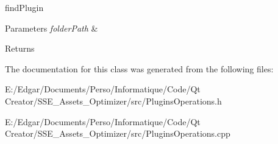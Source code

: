 find\+Plugin 


\begin{DoxyParams}{Parameters}
{\em folder\+Path} & \\
\hline
\end{DoxyParams}
\begin{DoxyReturn}{Returns}

\end{DoxyReturn}


The documentation for this class was generated from the following files\+:\begin{DoxyCompactItemize}
\item 
E\+:/\+Edgar/\+Documents/\+Perso/\+Informatique/\+Code/\+Qt Creator/\+S\+S\+E\+\_\+\+Assets\+\_\+\+Optimizer/src/Plugins\+Operations.\+h\item 
E\+:/\+Edgar/\+Documents/\+Perso/\+Informatique/\+Code/\+Qt Creator/\+S\+S\+E\+\_\+\+Assets\+\_\+\+Optimizer/src/Plugins\+Operations.\+cpp\end{DoxyCompactItemize}
